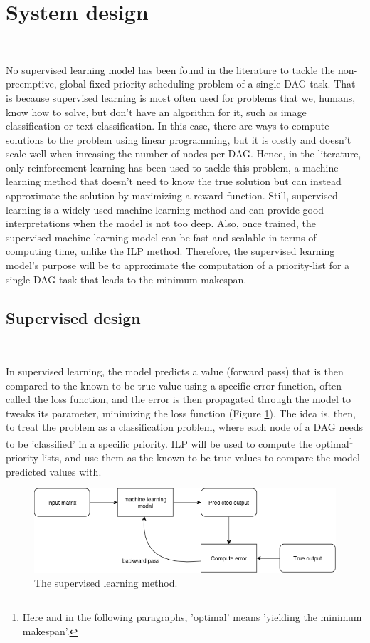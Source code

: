 \section{System design}
\label{sec:system_design}
~

No supervised learning model has been found in the literature to 
tackle the non-preemptive, global fixed-priority scheduling problem of a single DAG task.
That is because supervised learning is most often used for problems
that we, humans, know how to solve, but don't have an algorithm for it,
such as image classification or text classification.
In this case, there are ways to compute solutions to the problem
using linear programming, but it is costly and doesn't scale well 
when inreasing the number of nodes per DAG.
Hence, in the literature, only reinforcement learning has been
used to tackle this problem, a machine learning method that 
doesn't need to know the true solution but 
can instead approximate the solution by maximizing a reward function.
Still, supervised learning is a widely used machine learning method
and can provide good interpretations when the model is not too deep.
Also, once trained, the supervised machine learning model can be 
fast and scalable in terms of computing time, unlike the ILP method.
Therefore, the supervised learning model's purpose will be to
approximate the computation of a priority-list for a single DAG task
that leads to the minimum makespan.

\subsection{Supervised design}
~

In supervised learning, 
the model predicts a value (forward pass) that is then compared to the known-to-be-true value using a
specific error-function, often called the loss function,
and the error is then propagated through the model to tweaks its parameter, minimizing the loss function
(Figure \ref{fig:supervised_learning}).
The idea is, then, to treat the problem as a classification problem,
where each node of a DAG needs to be 'classified' in a specific priority.
ILP will be used to compute the optimal\footnote{Here and in the following paragraphs, 'optimal' means 'yielding the minimum makespan'.}
priority-lists, and use them as the known-to-be-true values to compare the model-predicted values with.


\begin{figure}
    \centering
    \includegraphics[width=\linewidth]{images/supervised_learning_diagram.drawio.png}
    \caption{The supervised learning method.}
    \label{fig:supervised_learning}
\end{figure}



